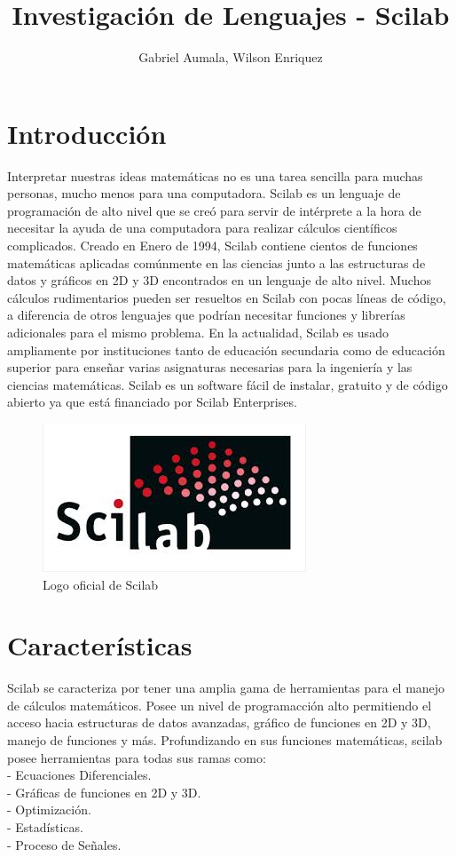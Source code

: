 \documentclass[11pt]{article} %
\title{Investigación de Lenguajes - Scilab}
\author{Gabriel Aumala, Wilson Enriquez}
\begin{document}
\maketitle

\section{Introducción}
Interpretar nuestras ideas matemáticas no es una tarea sencilla para muchas personas, mucho menos para una computadora. Scilab es un lenguaje de programación de alto nivel que se creó para servir de intérprete a la hora de necesitar la ayuda de una computadora para realizar cálculos científicos complicados.  Creado en Enero de 1994, Scilab contiene cientos de funciones matemáticas aplicadas comúnmente en las ciencias junto a las estructuras de datos y gráficos en 2D y 3D encontrados en un lenguaje de alto nivel. Muchos cálculos rudimentarios pueden ser resueltos en Scilab con pocas líneas de código, a diferencia de otros lenguajes que podrían necesitar funciones y librerías adicionales para el mismo problema. En la actualidad, Scilab es usado ampliamente por instituciones tanto de educación secundaria como de educación superior para enseñar varias asignaturas necesarias para la ingeniería y las ciencias matemáticas. Scilab es un software fácil de instalar, gratuito y de código abierto ya que está financiado por Scilab Enterprises. 

\begin{figure}
  \centering
    \includegraphics{logosci}
  \caption{Logo oficial de Scilab}
  \label{fig:ejemplo}
\end{figure}

\section{Características}
Scilab se caracteriza por tener una amplia gama de herramientas para el manejo de cálculos matemáticos. Posee un nivel de programacción alto permitiendo el acceso hacia estructuras de datos avanzadas, gráfico de funciones en 2D y 3D, manejo de funciones y más.
Profundizando en sus funciones matemáticas, scilab posee herramientas para todas sus ramas como:
\\%
- Ecuaciones Diferenciales.
\\%
- Gráficas de funciones en 2D y 3D.
\\%
- Optimización.
\\%
- Estadísticas.
\\%
- Proceso de Señales.
\end{document}
